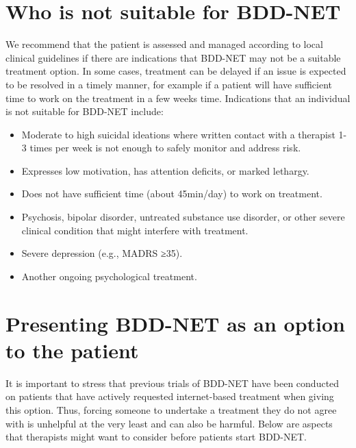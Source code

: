 \documentclass[]{book}
\providecommand{\tightlist}{%
  \setlength{\itemsep}{0pt}\setlength{\parskip}{0pt}}
\theoremstyle{definition}
\theoremstyle{definition}
\theoremstyle{definition}
\theoremstyle{remark}
\begin{document}
\hypertarget{who-is-not-suitable-for-bdd-net}{%
\section{Who is not suitable for
BDD-NET}\label{who-is-not-suitable-for-bdd-net}}

We recommend that the patient is assessed and managed according to local
clinical guidelines if there are indications that BDD-NET may not be a
suitable treatment option. In some cases, treatment can be delayed if an
issue is expected to be resolved in a timely manner, for example if a
patient will have sufficient time to work on the treatment in a few
weeks time. Indications that an individual is not suitable for BDD-NET
include:

\begin{itemize}
\tightlist
\item
  Moderate to high suicidal ideations where written contact with a
  therapist 1-3 times per week is not enough to safely monitor and
  address risk.\\
\item
  Expresses low motivation, has attention deficits, or marked
  lethargy.\\
\item
  Does not have sufficient time (about 45min/day) to work on
  treatment.\\
\item
  Psychosis, bipolar disorder, untreated substance use disorder, or
  other severe clinical condition that might interfere with treatment.\\
\item
  Severe depression (e.g., MADRS ≥35).\\
\item
  Another ongoing psychological treatment.
\end{itemize}

\hypertarget{presenting-bdd-net-as-an-option-to-the-patient}{%
\section{Presenting BDD-NET as an option to the
patient}\label{presenting-bdd-net-as-an-option-to-the-patient}}

It is important to stress that previous trials of BDD-NET have been
conducted on patients that have actively requested internet-based
treatment when giving this option. Thus, forcing someone to undertake a
treatment they do not agree with is unhelpful at the very least and can
also be harmful. Below are aspects that therapists might want to
consider before patients start BDD-NET.
\end{document}
